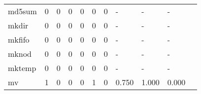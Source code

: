 \begin{longtable}{lp{1.2cm}p{1.2cm}p{1.2cm}p{1.2cm}p{1.2cm}p{1.2cm}p{1.2cm}p{1.2cm}p{1.2cm}p{1.2cm}}
md5sum    &                                     0 &                                                  0 &                                                  0 &                                                  0 &                                                  0 &                                                  0 &                                             - &                                                  - &                                                  - \\
mkdir     &                                     0 &                                                  0 &                                                  0 &                                                  0 &                                                  0 &                                                  0 &                                             - &                                                  - &                                                  - \\
mkfifo    &                                     0 &                                                  0 &                                                  0 &                                                  0 &                                                  0 &                                                  0 &                                             - &                                                  - &                                                  - \\
mknod     &                                     0 &                                                  0 &                                                  0 &                                                  0 &                                                  0 &                                                  0 &                                             - &                                                  - &                                                  - \\
mktemp    &                                     0 &                                                  0 &                                                  0 &                                                  0 &                                                  0 &                                                  0 &                                             - &                                                  - &                                                  - \\
mv        &                                     1 &                                                  0 &                                                  0 &                                                  0 &                                                  1 &                                                  0 &                                         0.750 &                                              1.000 &                                              0.000 \\

\end{longtable}
